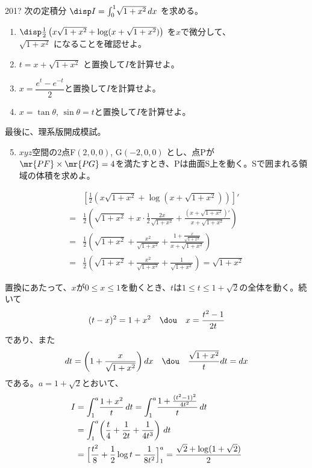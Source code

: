 \begin{prob}{201}{\hosi ?}{}
 次の定積分 $\disp I=\int_0^1\! \sqrt{1+x^2} \,dx$ を求める。
 \begin{enumerate}
  \item $\disp \frac{1}{2}\left(x\sqrt{1+x^2}+\log (x+\sqrt{1+x^2})\right)$ を$x$で微分して、\\ $\sqrt{1+x^2}$ になることを確認せよ。
  \item $t=x+\sqrt{1+x^2}$ と置換して$I$を計算せよ。
  \item $x=\dfrac{e^t-e^{-t}}{2}$と置換して$I$を計算せよ。
  \item $x=\tan\theta$, $\sin\theta=t$と置換して$I$を計算せよ。
 \end{enumerate}

 最後に、理系版開成模試。
 \begin{enumerate}
  \setcounter{enumi}{4}
  \item $xyz$空間の2点F$(2,0,0)$, G$(-2,0,0)$ とし、点Pが$\mr{PF}\times\mr{PG}=4$を満たすとき、Pは曲面S上を動く。Sで囲まれる領域の体積を求めよ。
 \end{enumerate}
\end{prob}

\begin{align*}
 &\left[\frac{1}{2}\left(x\sqrt{1+x^2}+\log (x+\sqrt{1+x^2})\right)\right]' \\
 =& \frac{1}{2}\left(\sqrt{1+x^2}+x\cdot\frac{1}{2}\frac{2x}{\sqrt{1+x^2}}+\frac{(x+\sqrt{1+x^2})'}{x+\sqrt{1+x^2}}\right) \\
 =& \frac{1}{2}\left(\sqrt{1+x^2}+\frac{x^2}{\sqrt{1+x^2}}+\frac{1+\frac{x}{\sqrt{1+x^2}}}{x+\sqrt{1+x^2}}\right) \\
 =& \frac{1}{2}\left(\sqrt{1+x^2}+\frac{x^2}{\sqrt{1+x^2}}+\frac{1}{\sqrt{1+x^2}}\right) = \sqrt{1+x^2}
\end{align*}

置換にあたって、$x$が$0\le x \le 1$を動くとき、$t$は$1\le t\le 1+\sqrt{2}$の全体を動く。続いて
\[ (t-x)^2=1+x^2 \quad\dou\quad x=\frac{t^2-1}{2t} \]
であり、また
\[ dt=\left(1+\frac{x}{\sqrt{1+x^2}}\right)dx \quad\dou\quad \frac{\sqrt{1+x^2}}{t}dt=dx \]
である。$a=1+\sqrt{2}$とおいて、
\begin{align*}
 I&=\int_1^a\! \frac{1+x^2}{t} \,dt = \int_1^a\!\frac{1+\frac{(t^2-1)^2}{4t^2}}{t} \,dt \\
 &= \int_1^a\!\left( \frac{t}{4}+\frac{1}{2t}+\frac{1}{4t^3}\right) \,dt \\
 &= \Bigl[ \frac{t^2}{8}+\frac{1}{2}\log t -\frac{1}{8t^2} \Bigr]_1^a = \frac{\sqrt{2}+\log (1+\sqrt{2})}{2}
\end{align*}

